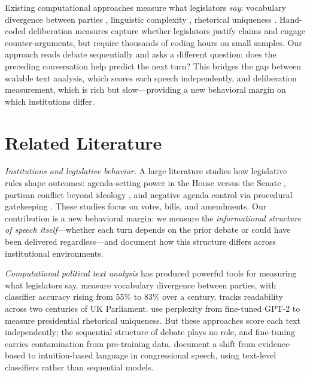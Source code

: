 \documentclass[12pt]{article}
\begin{document}
Existing computational approaches measure what legislators \textit{say}: vocabulary divergence between parties \citep{gentzkow2019}, linguistic complexity \citep{spirling2016}, rhetorical uniqueness \citep{zhou2024}. Hand-coded deliberation measures \citep{steiner2004, bachtiger2019} capture whether legislators justify claims and engage counter-arguments, but require thousands of coding hours on small samples. Our approach reads debate sequentially and asks a different question: does the preceding conversation help predict the next turn? This bridges the gap between scalable text analysis, which scores each speech independently, and deliberation measurement, which is rich but slow---providing a new behavioral margin on which institutions differ.


\section{Related Literature}

\textit{Institutions and legislative behavior.} A large literature studies how legislative rules shape outcomes: agenda-setting power in the House versus the Senate \citep{perssonTabellini2000, perssonTabellini2003}, partisan conflict beyond ideology \citep{lee2009}, and negative agenda control via procedural gatekeeping \citep{jenkins2006}. These studies focus on votes, bills, and amendments. Our contribution is a new behavioral margin: we measure the \textit{informational structure of speech itself}---whether each turn depends on the prior debate or could have been delivered regardless---and document how this structure differs across institutional environments.

\textit{Computational political text analysis} has produced powerful tools for measuring what legislators say. \citet{gentzkow2019} measure vocabulary divergence between parties, with classifier accuracy rising from 55\% to 83\% over a century. \citet{spirling2016} tracks readability across two centuries of UK Parliament. \citet{zhou2024} use perplexity from fine-tuned GPT-2 to measure presidential rhetorical uniqueness. But these approaches score each text independently; the sequential structure of debate plays no role, and fine-tuning carries contamination from pre-training data. \citet{aroyehun2025} document a shift from evidence-based to intuition-based language in congressional speech, using text-level classifiers rather than sequential models.
\end{document}
